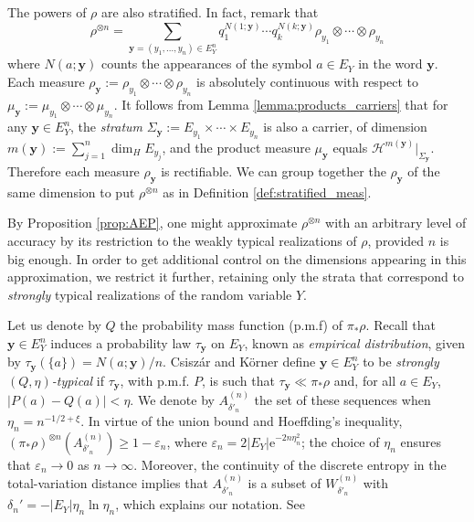 \documentclass[runningheads]{llncs}
\renewcommand{\epsilon}{\varepsilon}
\newcommand{\e}{\mathrm{e}}
\newcommand{\V}[1]{\mathbf{#1}}
\begin{document}
 The powers of $\rho$ are also stratified. In fact, remark that 
 \begin{equation}
\rho^{\otimes n} = \sum_{\V y=(y_1,...,y_n) \in E_Y^n}  q_1^{N(1;\V y)} \cdots q_k^{N(k;\V y)} \rho_{y_1}\otimes \cdots \otimes \rho_{y_n}
\end{equation}
where $N(a;\V y)$ counts the appearances of the symbol $a\in E_Y$ in the word $\V y$. Each measure $\rho_{\V y} := \rho_{y_1}\otimes \cdots \otimes \rho_{y_n}$ is absolutely continuous with respect to $\mu_{\V y}:= \mu_{y_1} \otimes \cdots \otimes \mu_{y_n}$. It follows from Lemma \ref{lemma:products_carriers}  that for any $\V y\in E_Y^n$,  the \emph{stratum} $\Sigma_{\V y}:= E_{y_1}\times \cdots \times E_{y_n}$ is also a carrier, of dimension $m(\V y) := \sum_{j=1}^n \dim_H E_{y_j}$, and the product measure $\mu_{\V y}$ equals $\mathcal H^{m(\V y)}|_{\Sigma_{\V y}}$. Therefore each measure $\rho_{\V y}$ is rectifiable. We can group together the $\rho_\V y$ of the same dimension to put $\rho^{\otimes n}$ as in Definition \ref{def:stratified_meas}.


By Proposition \ref{prop:AEP}, one might approximate $\rho^{\otimes n}$ with an arbitrary level of accuracy by its restriction to the weakly typical realizations of $\rho$, provided $n$ is big enough. In order to get additional control on the dimensions appearing in this approximation, we restrict it further, retaining only the strata that correspond to \emph{strongly} typical realizations of the random variable $Y$. 

Let us denote by $Q$ the probability mass function (p.m.f) of $\pi_*\rho$. Recall that $\V y\in E_Y^n$ induces a probability law $\tau_{\V y}$ on $E_Y$, known as \emph{empirical distribution},  given by 
$\tau_{\V y}(\{a\}) = N(a;\V y)/n.$  Csisz\'ar and K\"orner \cite[Ch.~2]{Csiszar1981} define $\V y\in E_Y^n$ to be \emph{strongly $(Q,\eta)$-typical} if $\tau_{\V y}$, with p.m.f. $P$, is such that  $\tau_{\V y} \ll \pi_*\rho$ and, for all $a\in E_Y$, $|P(a)-Q(a)|<\eta$. We denote by $A_{\delta'_n}^{(n)}$ the set of these sequences when $\eta_n = n^{-1/2+\xi}$. In virtue of the union bound and Hoeffding's inequality, $(\pi_*\rho)^{\otimes n}(A_{\delta'_n}^{(n)})\geq 1-\epsilon_n$, 
where $\epsilon_n = 2|E_Y|\e^{-2n\eta_n^2}$; the choice of $\eta_n$ ensures that $\epsilon_n\to 0$ as $n\to\infty$. Moreover, the continuity of the discrete entropy in the total-variation distance implies that $A^{(n)}_{\delta'_n}$ is a subset of $W^{(n)}_{\delta'_n}$ with $\delta_n'=-|E_Y|\eta_n\ln \eta_n$, which explains our notation. See \cite[Sec. III-D]{Vigneaux-stratified}
\end{document}
